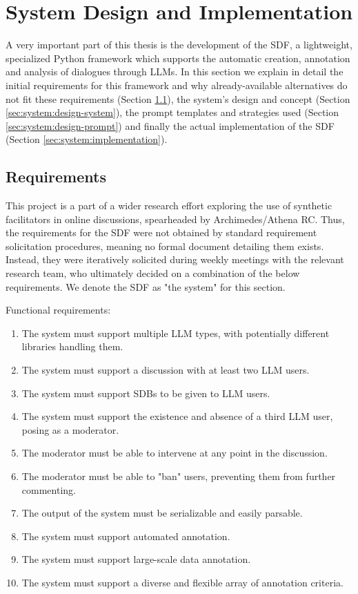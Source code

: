 %
\chapter{System Design and Implementation}
\label{sec:system}

A very important part of this thesis is the development of the \ac{SDF}, a lightweight, specialized Python framework which supports the automatic creation, annotation and analysis of dialogues through LLMs. In this section we explain in detail the initial requirements for this framework and why already-available alternatives do not fit these requirements (Section \ref{sec:system:requirements}), the system's design and concept (Section \ref{sec:system:design-system}), the prompt templates and strategies used (Section \ref{sec:system:design-prompt}) and finally the actual implementation of the \ac{SDF} (Section \ref{sec:system:implementation}).

\section{Requirements}
\label{sec:system:requirements}

This project is a part of a wider research effort exploring the use of synthetic facilitators in online discussions, spearheaded by Archimedes/Athena RC. Thus, the requirements for the \ac{SDF} were not obtained by standard requirement solicitation procedures, meaning no formal document detailing them exists. Instead, they were iteratively solicited during weekly meetings with the relevant research team, who ultimately decided on a combination of the below requirements. We denote the \ac{SDF} as "the system" for this section.

Functional requirements:
\begin{enumerate}
	\item The system must support multiple LLM types, with potentially different libraries handling them.
	\item The system must support a discussion with at least two LLM users.
	\item The system must support \acp{SDB} to be given to LLM users.
	\item The system must support the existence and absence of a third LLM user, posing as a moderator.
	\item The moderator must be able to intervene at any point in the discussion.
	\item The moderator must be able to "ban" users, preventing them from further commenting.
	\item The output of the system must be serializable and easily parsable.
	\item The system must support automated annotation.
	\item The system must support large-scale data annotation.
	\item The system must support a diverse and flexible array of annotation criteria.
\end{enumerate}

